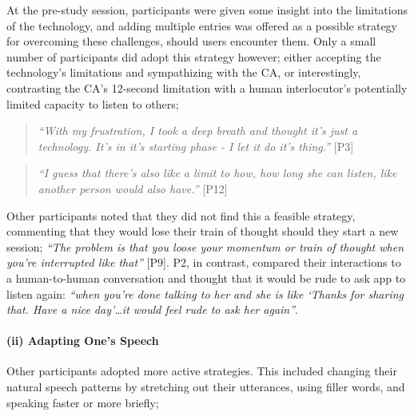                 At the pre-study session, participants were given some insight into the limitations of the technology, and adding multiple entries was offered as a possible strategy for overcoming these challenges, should users encounter them. Only a small number of participants did adopt this strategy however; either accepting the technology's limitations and sympathizing with the CA, or interestingly, contrasting the \ac{CA}'s 12-second limitation with a human interlocutor's potentially limited capacity to listen to others;
                
                    \begin{quote}
                    \vspace{2mm}
                        \textit{``With my frustration, I took a deep breath and thought it’s just a technology. It’s in it’s starting phase - I let it do it’s thing.''} [P3]
                    \vspace{2mm}
                    \end{quote}
                    
                    \begin{quote}
                    \vspace{2mm}
                        \textit{``I guess that there's also like a limit to how, how long she can listen, like another person would also have.''} [P12]
                    \vspace{2mm}
                    \end{quote}
                
               Other participants noted that they did not find this a feasible strategy, commenting that they would lose their train of thought should they start a new session; \textit{``The problem is that you loose your momentum or train of thought when you're interrupted like that''} [P9]. P2, in contrast, compared their interactions to a human-to-human conversation and thought that it would be rude to ask \acl{app} to listen again: \textit{``when you're done talking to her and she is like `Thanks for sharing that. Have a nice day'\ldots it would feel rude to ask her again''}.

            \paragraph{(ii) Adapting One's Speech}
    
                Other participants adopted more active strategies. This included changing their natural speech patterns by stretching out their utterances, using filler words, and speaking faster or more briefly;
                
